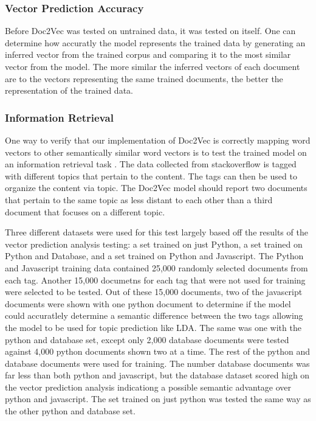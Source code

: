 \subsubsection{Vector Prediction Accuracy}

Before Doc2Vec was tested on untrained data, it was tested on itself. One can determine how accuratly the model represents the trained data by generating an inferred vector from the trained corpus and comparing it to the most similar vector from the model. The more similar the inferred vectors of each document are to the vectors representing the same trained documents, the better the representation of the trained data. 

\subsubsection{Information Retrieval}

One way to verify that our implementation of Doc2Vec is correctly mapping word vectors to other semantically similar word vectors is to test the trained model on an information retrieval task . \cite{RefWorks:doc:5a6e5746e4b0d609eec798d7} The data collected from stackoverflow is tagged with different topics that pertain to the content. The tags can then be used to organize the content via topic. The Doc2Vec model should report two documents that pertain to the same topic as less distant to each other than a third document that focuses on a different topic.

Three different datasets were used for this test largely based off the results of the vector prediction analysis testing: a set trained on just Python, a set trained on Python and Database, and a set trained on Python and Javascript. The Python and Javascript training data contained 25,000 randomly selected documents from each tag. Another 15,000 documetns for each tag that were not used for training were selected to be tested. Out of these 15,000 documents, two of the javascript documents were shown with one python document to determine if the model could accuratlely determine a semantic difference between the two tags allowing the model to be used for topic prediction like LDA. The same was one with the python and database set, except only 2,000 database documents were tested against 4,000 python documents shown two at a time. The rest of the python and database documents were used for training. The number database documents was far less than both python and javascript, but the database dataset scored high on the vector prediction analysis indicationg a possible semantic advantage over python and javascript. The set trained on just python was tested the same way as the other python and database set.

